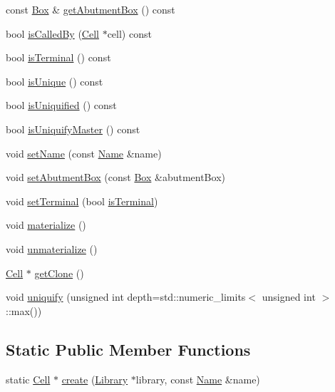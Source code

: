 \begin{DoxyCompactItemize}
\item 
const \hyperlink{classHurricane_1_1Box}{Box} \& \hyperlink{classHurricane_1_1Cell_ad471e416fb3dc2e3674fe0b7ae1b76ce}{get\-Abutment\-Box} () const 
\item 
bool \hyperlink{classHurricane_1_1Cell_a34f3ce9b105b921a386ae056036540f6}{is\-Called\-By} (\hyperlink{classHurricane_1_1Cell}{Cell} $\ast$cell) const 
\item 
bool \hyperlink{classHurricane_1_1Cell_a507a405b9e561a88a106e424068df97e}{is\-Terminal} () const 
\item 
bool \hyperlink{classHurricane_1_1Cell_a7f392aea820c87a7c7a660aedba06b65}{is\-Unique} () const 
\item 
bool \hyperlink{classHurricane_1_1Cell_a65696c7418a2b7f84879af2855c2ed07}{is\-Uniquified} () const 
\item 
bool \hyperlink{classHurricane_1_1Cell_afb3fde870d4fe64688a76ec5040d3030}{is\-Uniquify\-Master} () const 
\item 
void \hyperlink{classHurricane_1_1Cell_ad2c9face922062664110c66ee205eab2}{set\-Name} (const \hyperlink{classHurricane_1_1Name}{Name} \&name)
\item 
void \hyperlink{classHurricane_1_1Cell_ab1949e2b708f0bd2d215ab90cfe864e0}{set\-Abutment\-Box} (const \hyperlink{classHurricane_1_1Box}{Box} \&abutment\-Box)
\item 
void \hyperlink{classHurricane_1_1Cell_a4591dc37153a835daa42b442221742cb}{set\-Terminal} (bool \hyperlink{classHurricane_1_1Cell_a507a405b9e561a88a106e424068df97e}{is\-Terminal})
\item 
void \hyperlink{classHurricane_1_1Cell_affefc597317063857f4904d4b16d5d4f}{materialize} ()
\item 
void \hyperlink{classHurricane_1_1Cell_a40c9ba4e3fc76b0c4bc58af8dcaddf53}{unmaterialize} ()
\item 
\hyperlink{classHurricane_1_1Cell}{Cell} $\ast$ \hyperlink{classHurricane_1_1Cell_a092f53c7f517ecc70d9ba375296c5d5b}{get\-Clone} ()
\item 
void \hyperlink{classHurricane_1_1Cell_aa113c121813342b6304f3e7fddbc8565}{uniquify} (unsigned int depth=std\-::numeric\-\_\-limits$<$ unsigned int $>$\-::max())
\end{DoxyCompactItemize}
\subsection*{Static Public Member Functions}
\begin{DoxyCompactItemize}
\item 
static \hyperlink{classHurricane_1_1Cell}{Cell} $\ast$ \hyperlink{classHurricane_1_1Cell_ad803afb3e52bea3bf3d520e353b162e0}{create} (\hyperlink{classHurricane_1_1Library}{Library} $\ast$library, const \hyperlink{classHurricane_1_1Name}{Name} \&name)
\end{DoxyCompactItemize}


